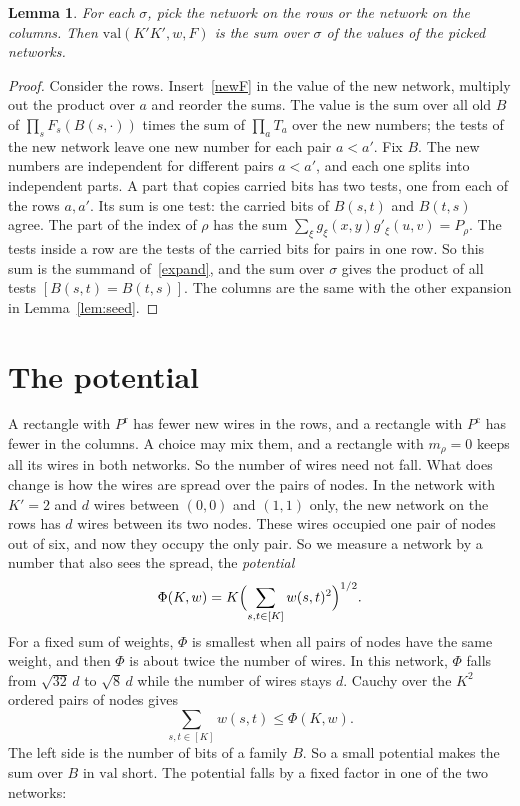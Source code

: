 \documentclass[11pt]{article}
\newtheorem{lemma}{Lemma}
\newcommand{\val}{\mathrm{val}}
\begin{document}
\begin{lemma}\label{lem:step}
For each $\sigma$, pick the network on the rows or the network on the columns. Then $\val(K'K',w,F)$ is the sum over $\sigma$ of the values of the picked networks.
\end{lemma}

\begin{proof}
Consider the rows. Insert~\eqref{newF} in the value of the new network, multiply out the product over $a$ and reorder the sums. The value is the sum over all old $B$ of $\prod_sF_s(B(s,\cdot))$ times the sum of $\prod_aT_a$ over the new numbers; the tests of the new network leave one new number for each pair $a<a'$. Fix $B$. The new numbers are independent for different pairs $a<a'$, and each one splits into independent parts. A part that copies carried bits has two tests, one from each of the rows $a,a'$. Its sum is one test: the carried bits of $B(s,t)$ and $B(t,s)$ agree. The part of the index of $\rho$ has the sum $\sum_\xi g_\xi(x,y)g'_\xi(u,v)=P_\rho$. The tests inside a row are the tests of the carried bits for pairs in one row. So this sum is the summand of~\eqref{expand}, and the sum over $\sigma$ gives the product of all tests $[B(s,t)=B(t,s)]$. The columns are the same with the other expansion in Lemma~\ref{lem:seed}.
\end{proof}

\section{The potential}\label{sec:pot}

A rectangle with $P^{\mathrm r}$ has fewer new wires in the rows, and a rectangle with $P^{\mathrm c}$ has fewer in the columns. A choice may mix them, and a rectangle with $m_\rho=0$ keeps all its wires in both networks. So the number of wires need not fall. What does change is how the wires are spread over the pairs of nodes. In the network with $K'=2$ and $d$ wires between $(0,0)$ and $(1,1)$ only, the new network on the rows has $d$ wires between its two nodes. These wires occupied one pair of nodes out of six, and now they occupy the only pair. So we measure a network by a number that also sees the spread, the \emph{potential}
\[
\Phi(K,w)=K\Bigl(\sum_{s,t\in[K]}w(s,t)^2\Bigr)^{1/2}.
\]
For a fixed sum of weights, $\Phi$ is smallest when all pairs of nodes have the same weight, and then $\Phi$ is about twice the number of wires. In this network, $\Phi$ falls from $\sqrt{32}\,d$ to $\sqrt8\,d$ while the number of wires stays $d$. Cauchy over the $K^2$ ordered pairs of nodes gives
\begin{equation}\label{ends}
\sum_{s,t\in[K]}w(s,t)\le\Phi(K,w).
\end{equation}
The left side is the number of bits of a family $B$. So a small potential makes the sum over $B$ in $\val$ short. The potential falls by a fixed factor in one of the two networks:
\end{document}
